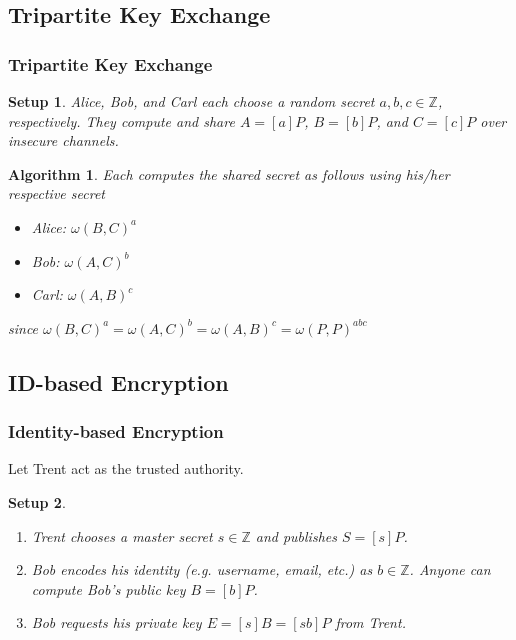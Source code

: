 \documentclass{beamer}
\newtheorem{algorithm}{Algorithm}
\newtheorem{setup}{Setup}
\begin{document}
    \subsection{Tripartite Key Exchange}
    \begin{frame}
        \frametitle{Tripartite Key Exchange}
        \begin{setup}
            Alice, Bob, and Carl each choose a random secret
            \(a, b, c \in \mathbb{Z}\), respectively. They compute and
            share \(A = [a]P\), \(B = [b]P\), and \(C = [c]P\)
            over insecure channels.
        \end{setup}
        \vfill
        \begin{algorithm}
            Each computes the shared secret as follows using his/her
            respective secret
            \begin{itemize}
                \item Alice: \(\omega(B, C)^a\)
                \item Bob: \(\omega(A, C)^b\)
                \item Carl: \(\omega(A, B)^c\)
            \end{itemize}
            since \(\omega(B, C)^a = \omega(A, C)^b = \omega(A, B)^c =
                \omega(P, P)^{abc}\)
        \end{algorithm}
    \end{frame}

    \subsection{ID-based Encryption}
    \begin{frame}
        \frametitle{Identity-based Encryption}
        Let Trent act as the trusted authority.
        \vfill
        \begin{setup}
            \begin{enumerate}
                \item Trent chooses a master secret \(s \in \mathbb{Z}\) and
                    publishes \(S = [s]P\).
                \item Bob encodes his identity (e.g. username, email, etc.)
                    as \(b \in \mathbb{Z}\). Anyone can compute Bob's public
                    key \(B = [b]P\).
                \item Bob requests his private key
                    \(E = [s]B = [sb]P\) from Trent.
            \end{enumerate}
        \end{setup}
    \end{frame}
\end{document}
